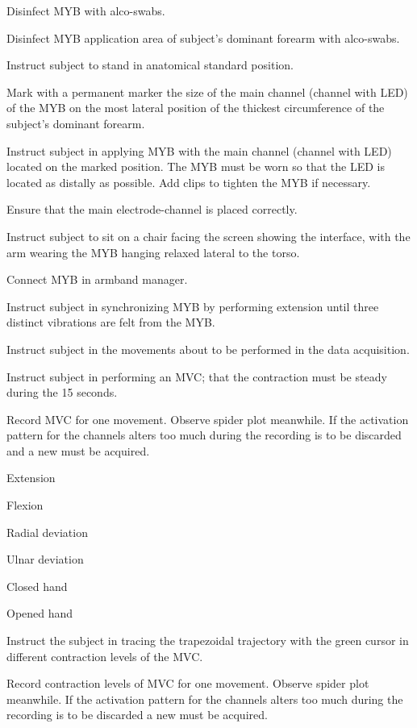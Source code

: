 \begin{todolist}
	\item Disinfect MYB with alco-swabs.
	\item Disinfect MYB application area of subject's dominant forearm with alco-swabs.
	\item Instruct subject to stand in anatomical standard position.
	\item Mark with a permanent marker the size of the main channel (channel with LED) of the MYB on the most lateral position of the thickest circumference of the subject's dominant forearm.
	\item Instruct subject in applying MYB with the main channel (channel with LED) located on the marked position. The MYB must be worn so that the LED is located as distally as possible. Add clips to tighten the MYB if necessary.
	\item Ensure that the main electrode-channel is placed correctly.
	\item Instruct subject to sit on a chair facing the screen showing the interface, with the arm wearing the MYB hanging relaxed lateral to the torso. 
	\item Connect MYB in armband manager.
	\item Instruct subject in synchronizing MYB by performing extension until three distinct vibrations are felt from the MYB. 
	\item Instruct subject in the movements about to be performed in the data acquisition.
	\item Instruct subject in performing an MVC; that the contraction must be steady during the 15 seconds.
	\item Record MVC for one movement. Observe spider plot meanwhile. If the activation pattern for the channels alters too much during the recording is to be discarded and a new must be acquired.
	\begin{todolist}
		\item Extension
		\item Flexion
		\item Radial deviation
		\item Ulnar deviation
		\item Closed hand
		\item Opened hand
	\end{todolist}
	\item Instruct the subject in tracing the trapezoidal trajectory with the green cursor in different contraction levels of the MVC.
	\item Record contraction levels of MVC for one movement. Observe spider plot meanwhile. If the activation pattern for the channels alters too much during the recording is to be discarded a new must be acquired.

\end{todolist}
